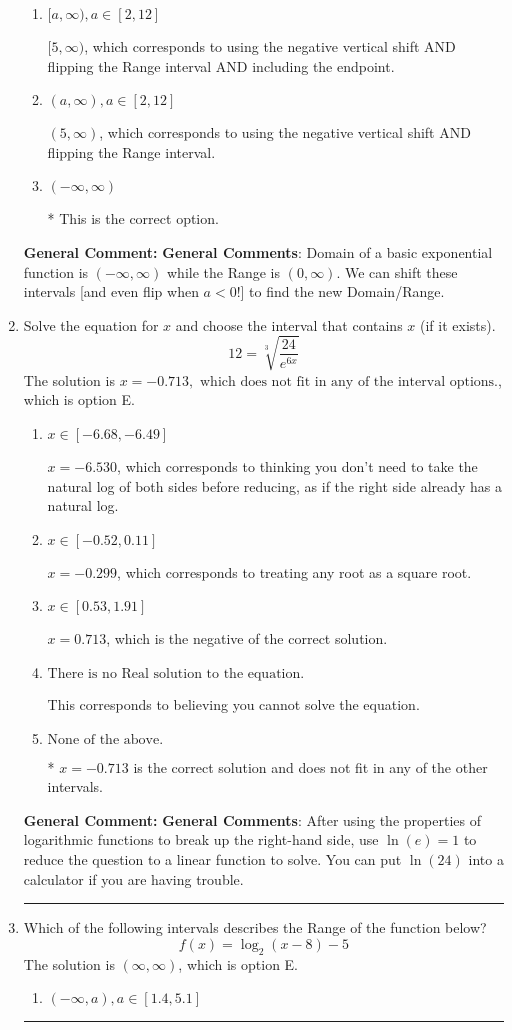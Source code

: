 \documentclass{extbook}[14pt]
\newcommand{\litem}[1]{\item #1

\rule{\textwidth}{0.4pt}}
\begin{document}
\begin{enumerate}
{\begin{enumerate}[label=\Alph*.]
$(-\infty, -5)$, which corresponds to using the correct vertical shift *if we wanted the Range*.
\item \( [a, \infty), a \in [2, 12] \)

$[5, \infty)$, which corresponds to using the negative vertical shift AND flipping the Range interval AND including the endpoint.
\item \( (a, \infty), a \in [2, 12] \)

$(5, \infty)$, which corresponds to using the negative vertical shift AND flipping the Range interval.
\item \( (-\infty, \infty) \)

* This is the correct option.
\end{enumerate}

\textbf{General Comment:} \textbf{General Comments}: Domain of a basic exponential function is $(-\infty, \infty)$ while the Range is $(0, \infty)$. We can shift these intervals [and even flip when $a<0$!] to find the new Domain/Range.
}
\litem{
 Solve the equation for $x$ and choose the interval that contains $x$ (if it exists).
\[  12 = \sqrt[3]{\frac{24}{e^{6x}}} \]The solution is \( x = -0.713, \text{ which does not fit in any of the interval options.} \), which is option E.\begin{enumerate}[label=\Alph*.]
\item \( x \in [-6.68, -6.49] \)

$x = -6.530$, which corresponds to thinking you don't need to take the natural log of both sides before reducing, as if the right side already has a natural log.
\item \( x \in [-0.52, 0.11] \)

$x = -0.299$, which corresponds to treating any root as a square root.
\item \( x \in [0.53, 1.91] \)

$x = 0.713$, which is the negative of the correct solution.
\item \( \text{There is no Real solution to the equation.} \)

This corresponds to believing you cannot solve the equation.
\item \( \text{None of the above.} \)

* $x = -0.713$ is the correct solution and does not fit in any of the other intervals.
\end{enumerate}

\textbf{General Comment:} \textbf{General Comments}: After using the properties of logarithmic functions to break up the right-hand side, use $\ln(e) = 1$ to reduce the question to a linear function to solve. You can put $\ln(24)$ into a calculator if you are having trouble.
}
\litem{
Which of the following intervals describes the Range of the function below?
\[ f(x) = \log_2{(x-8)}-5 \]The solution is \( (\infty, \infty) \), which is option E.\begin{enumerate}[label=\Alph*.]
\item \( (-\infty, a), a \in [1.4, 5.1] \)


\end{enumerate}}
\end{enumerate}
\end{document}
